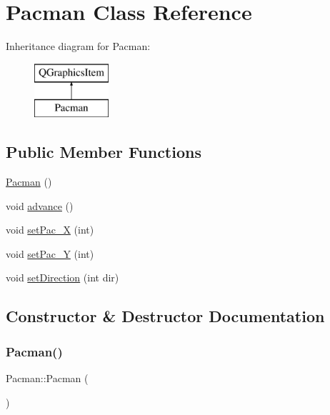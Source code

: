\hypertarget{class_pacman}{}\section{Pacman Class Reference}
\label{class_pacman}
Inheritance diagram for Pacman\+:\begin{figure}[H]
\begin{center}
\leavevmode
\includegraphics[height=2.000000cm]{class_pacman}
\end{center}
\end{figure}
\subsection*{Public Member Functions}
\begin{DoxyCompactItemize}
\item 
\mbox{\hyperlink{class_pacman_a499408baab38f119ebd4f41e90fbe3fe}{Pacman}} ()
\item 
void \mbox{\hyperlink{class_pacman_a560007dd011f202daaac68068c527e09}{advance}} ()
\item 
void \mbox{\hyperlink{class_pacman_a532e817b83bc0315b2ab666b2c90ab1a}{set\+Pac\+\_\+X}} (int)
\item 
void \mbox{\hyperlink{class_pacman_ad8250d3b6e8e9300bfe9ab650edca7e1}{set\+Pac\+\_\+Y}} (int)
\item 
void \mbox{\hyperlink{class_pacman_a388f4708c08ba930b471237a897f522e}{set\+Direction}} (int dir)
\end{DoxyCompactItemize}


\subsection{Constructor \& Destructor Documentation}
\mbox{\label{class_pacman_a499408baab38f119ebd4f41e90fbe3fe}} 
\subsubsection{\texorpdfstring{Pacman()}{Pacman()}}
{\footnotesize\ttfamily Pacman\+::\+Pacman (\begin{DoxyParamCaption}{ }\end{DoxyParamCaption})}

